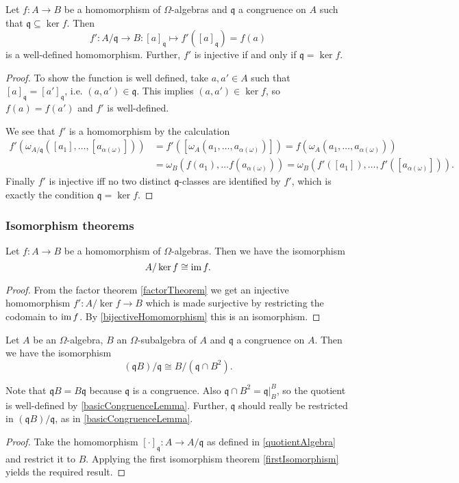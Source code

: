 \begin{proposition} \label{factorTheorem}
Let $f:A\to B$ be a homomorphism of $\Omega$-algebras and $\mathfrak{q}$ a congruence on $A$ such that $\mathfrak{q}\subseteq \ker f$. Then
\[ f': A/\mathfrak{q} \to B: [a]_\mathfrak{q} \mapsto f'([a]_\mathfrak{q}) = f(a) \]
is a well-defined homomorphism. Further, $f'$ is injective \textup{if and only if} $\mathfrak{q} = \ker f$.
\end{proposition}
\begin{proof}
To show the function is well defined, take $a,a'\in A$ such that $[a]_\mathfrak{q} = [a']_\mathfrak{q}$, i.e. $(a,a')\in \mathfrak{q}$. This implies $(a,a')\in\ker f$, so $f(a) = f(a')$ and $f'$ is well-defined.

We see that $f'$ is a homomorphism by the calculation
\begin{align*}
f'(\omega_{A/\mathfrak{q}}([a_1], \ldots, [a_{\alpha(\omega)}])) &= f'([\omega_{A}(a_1, \ldots, a_{\alpha(\omega)})]) = f(\omega_{A}(a_1, \ldots, a_{\alpha(\omega)})) \\
&= \omega_B(f(a_1), \ldots f(a_{\alpha(\omega)})) = \omega_B(f'([a_1]), \ldots, f'([a_{\alpha(\omega)}])).
\end{align*}
Finally $f'$ is injective iff no two distinct $\mathfrak{q}$-classes are identified by $f'$, which is exactly the condition $\mathfrak{q} = \ker f$.
\end{proof}

\subsubsection{Isomorphism theorems}
\begin{theorem} \label{firstIsomorphism}
Let $f:A\to B$ be a homomorphism of $\Omega$-algebras. Then we have the isomorphism
\[ A/\ker f \cong \operatorname{im} f. \]
\end{theorem}
\begin{proof}
From the factor theorem \ref{factorTheorem} we get an injective homomorphism $f': A/\ker f \to B$ which is made surjective by restricting the codomain to $\operatorname{im} f$. By \ref{bijectiveHomomorphism} this is an isomorphism.
\end{proof}

\begin{theorem}
Let $A$ be an $\Omega$-algebra, $B$ an $\Omega$-subalgebra of $A$ and $\mathfrak{q}$ a congruence on $A$. Then we have the isomorphism
\[ (\mathfrak{q}B)/\mathfrak{q} \cong B/(\mathfrak{q}\cap B^2). \]
\end{theorem}
Note that $\mathfrak{q}B = B\mathfrak{q}$ because $\mathfrak{q}$ is a congruence. Also $\mathfrak{q}\cap B^2 = \mathfrak{q}|_B^B$, so the quotient is well-defined by \ref{basicCongruenceLemma}. Further, $\mathfrak{q}$ should really be restricted in $(\mathfrak{q}B)/\mathfrak{q}$, as in \ref{basicCongruenceLemma}.
\begin{proof}
Take the homomorphism $[\cdot]_\mathfrak{q}:A \to A/\mathfrak{q}$ as defined in \ref{quotientAlgebra} and restrict it to $B$. Applying the first isomorphism theorem \ref{firstIsomorphism} yields the required result.
\end{proof}

